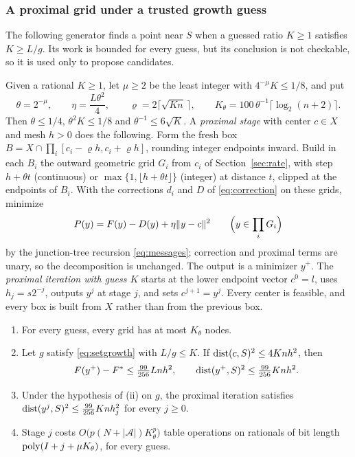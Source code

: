 \subsubsection{A proximal grid under a trusted growth guess}

The following generator finds a point near $S$ when a guessed ratio
$K\ge1$ satisfies $K\ge L/g$. Its work is bounded for every guess, but its
conclusion is not checkable, so it is used only to propose candidates.

Given a rational $K\ge1$, let $\mu\ge2$ be the least integer with
$4^{-\mu}K\le1/8$, and put
\[
\theta=2^{-\mu},\qquad\eta=\frac{L\theta^2}4,\qquad
\varrho=2\bigl\lceil\sqrt{Kn}\,\bigr\rceil,\qquad
K_\theta=100\,\theta^{-1}\lceil\log_2(n+2)\rceil .
\]
Then $\theta\le1/4$, $\theta^2K\le1/8$ and $\theta^{-1}\le6\sqrt K$.
A \emph{proximal stage} with center $c\in X$ and mesh $h>0$ does the
following. Form the fresh box $B=X\cap\prod_i[c_i-\varrho h,c_i+\varrho h]$,
rounding integer endpoints inward. Build in each $B_i$ the outward geometric
grid $G_i$ from $c_i$ of Section~\ref{sec:rate}, with step $h+\theta t$
(continuous) or $\max\{1,\lfloor h+\theta t\rfloor\}$ (integer) at distance
$t$, clipped at the endpoints of $B_i$. With the corrections $d_i$ and $D$ of
\eqref{eq:correction} on these grids, minimize
\[
P(y)=F(y)-D(y)+\eta\lVert y-c\rVert^2\qquad\Bigl(y\in\prod_iG_i\Bigr)
\]
by the junction-tree recursion \eqref{eq:messages}; correction and proximal
terms are unary, so the decomposition is unchanged. The output is a
minimizer $y^+$. The \emph{proximal iteration with guess $K$} starts at the
lower endpoint vector $c^0=l$, uses $h_j=s2^{-j}$, outputs $y^j$ at stage $j$,
and sets $c^{j+1}=y^j$. Every center is feasible, and every box is built from
$X$ rather than from the previous box.

\begin{lemma}\label{lem:proximal}
\begin{enumerate}
\item[(i)] For every guess, every grid has at most $K_\theta$ nodes.
\item[(ii)] Let $g$ satisfy \eqref{eq:setgrowth} with $L/g\le K$. If
$\operatorname{dist}(c,S)^2\le4Knh^2$, then
\[
F(y^+)-F^*\le\tfrac{99}{256}Lnh^2,\qquad
\operatorname{dist}(y^+,S)^2\le\tfrac{99}{256}Knh^2 .
\]
\item[(iii)] Under the hypothesis of (ii) on $g$, the proximal iteration
satisfies $\operatorname{dist}(y^j,S)^2\le\frac{99}{256}Knh_j^2$ for every $j\ge0$.
\item[(iv)] Stage $j$ costs $O\bigl(p(N+|\mathcal A|)K_\theta^p\bigr)$ table
operations on rationals of bit length $\operatorname{poly}(I+j+\mu K_\theta)$, for every
guess.
\end{enumerate}
\end{lemma}

